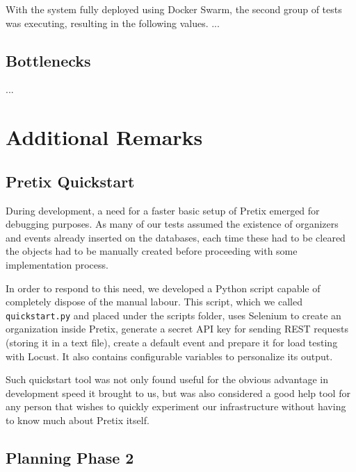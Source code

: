 \documentclass[12pt]{article}
\begin{document}
With the system fully deployed using Docker Swarm, the second group of tests was executing, resulting in the following values.
... 

\subsection{Bottlenecks} \label{performance.bottlenecks} %


...

\newpage
\section{Additional Remarks} \label{remarks} %

\subsection{Pretix Quickstart} \label{remarks.quickstart} %


During development, a need for a faster basic setup of Pretix emerged for debugging purposes.
As many of our tests assumed the existence of organizers and events already inserted on the databases, each time these had to be cleared the objects had to be 
manually created before proceeding with some implementation process.

In order to respond to this need, we developed a Python script capable of completely dispose of the manual labour.
This script, which we called \texttt{quickstart.py} and placed under the scripts folder, uses Selenium \cite{selenium} to create an organization inside Pretix, 
generate a secret API key for sending REST requests (storing it in a text file), create a default event and prepare it for load testing with Locust.
It also contains configurable variables to personalize its output.

Such quickstart tool was not only found useful for the obvious advantage in development speed it brought to us, but was also considered a good help tool for any 
person that wishes to quickly experiment our infrastructure without having to know much about Pretix itself.

\subsection{Planning Phase 2} \label{remarks.planning} %
\end{document}
